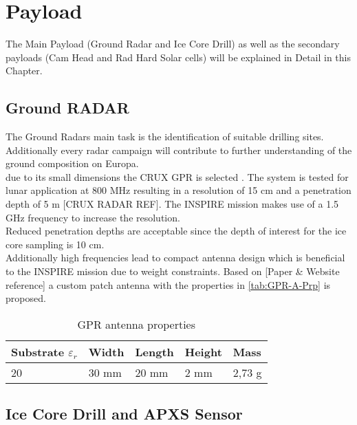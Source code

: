 
\chapter{Payload}
\label{chap:payload}

The Main Payload (Ground Radar and Ice Core Drill) as well as the secondary payloads (Cam Head and Rad Hard Solar cells) will be explained in Detail in this Chapter.

\section{Ground RADAR}
The Ground Radars main task is the identification of suitable drilling sites. Additionally every radar campaign will contribute to further understanding of the ground composition on Europa.\\

due to its small dimensions the CRUX GPR is selected . The system is tested for lunar application at 800 MHz resulting in a resolution of 15 cm and a penetration depth of 5 m [CRUX RADAR REF]. The INSPIRE mission makes use of a 1.5 GHz frequency to increase the resolution. \\
Reduced penetration depths are acceptable since the depth of interest for the ice core sampling is 10 cm. \\

Additionally high frequencies lead to compact antenna design which is beneficial to the INSPIRE mission due to weight constraints. 
Based on [Paper \& Website reference] a custom patch antenna with the properties in \autoref{tab:GPR-A-Prp} is proposed.

\begin{table}[h]
\centering
\begin{tabular}{lllll}
Substrate ${\varepsilon}_{r}$ & Width & Length & Height & Mass   \\ \hline\hline
20                         & 30 mm & 20 mm  & 2 mm   & 2,73 g  \\ \hline
\end{tabular}
\caption{GPR antenna properties}
\label{tab:GPR-A-Prp}
\end{table}

\section{Ice Core Drill and APXS Sensor}

